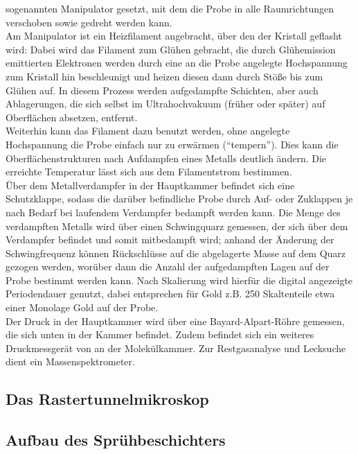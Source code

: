 sogenannten Manipulator gesetzt, mit dem die Probe in alle Raumrichtungen verschoben sowie gedreht
werden kann. \\
Am Manipulator ist ein Heizfilament angebracht, über den der Kristall geflasht wird:
Dabei wird das Filament zum Glühen gebracht, die durch Glühemission emittierten Elektronen werden
durch eine an die Probe angelegte Hochspannung zum Kristall hin beschleunigt und heizen diesen dann
durch Stöße bis zum Glühen auf. In diesem Prozess werden aufgedampfte Schichten, aber auch
Ablagerungen, die sich selbst im Ultrahochvakuum (früher oder später) auf Oberflächen absetzen,
entfernt.\\
Weiterhin kann das Filament dazu benutzt werden, ohne angelegte Hochspannung die Probe einfach nur
zu erwärmen ("`tempern"'). Dies kann die Oberflächenstrukturen nach Aufdampfen eines Metalls
deutlich ändern. Die erreichte Temperatur lässt sich aus dem Filamentstrom bestimmen.\\
 Über dem Metallverdampfer in der Hauptkammer befindet sich eine
Schutzklappe, sodass die darüber befindliche Probe durch Auf- oder Zuklappen je nach Bedarf bei laufendem Verdampfer bedampft werden
kann. Die Menge des verdampften Metalls wird über einen Schwingquarz gemessen, der sich über dem
Verdampfer befindet und somit mitbedampft wird; anhand der Änderung der Schwingfrequenz können
Rückschlüsse auf die abgelagerte Masse auf dem Quarz gezogen werden, worüber dann die Anzahl der
aufgedampften Lagen auf der Probe bestimmt werden kann. Nach Skalierung wird hierfür die digital
angezeigte Periodendauer genutzt, dabei entsprechen für Gold z.B. 250 Skaltenteile etwa einer
Monolage Gold auf der Probe.\\
Der Druck in der Hauptkammer wird über eine Bayard-Alpart-Röhre gemessen, die sich unten in der
Kammer befindet. Zudem befindet sich ein weiteres Druckmessgerät von %
an der Molekülkammer.
Zur Restgasanalyse und Lecksuche dient ein Massenspektrometer.%


\subsection{Das Rastertunnelmikroskop}




\subsection{Aufbau des Sprühbeschichters}

